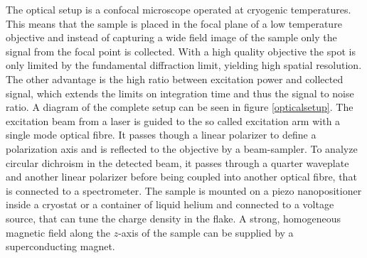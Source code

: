The optical setup is a confocal microscope operated at cryogenic temperatures. This means that the sample is placed in the focal plane of a low temperature objective and instead of capturing a wide field image of the sample only the signal from the focal point is collected. With a high quality objective the spot is only limited by the fundamental diffraction limit, yielding high spatial resolution. The other advantage is the high ratio between excitation power and collected signal, which extends the limits on integration time and thus the signal to noise ratio. A diagram of the complete setup can be seen in figure \ref{opticalsetup}. The excitation beam from a laser is guided to the so called excitation arm with a single mode optical fibre. It passes though a linear polarizer to define a polarization axis and is reflected to the objective by a beam-sampler. To analyze circular dichroism in the detected beam, it passes through a quarter waveplate and another linear polarizer before being coupled into another optical fibre, that is connected to a spectrometer. The sample is mounted on a piezo nanopositioner inside a cryostat or a container of liquid helium and connected to a voltage source, that can tune the charge density in the \tmdg flake. A strong, homogeneous magnetic field along the $z$-axis of the sample can be supplied by a superconducting magnet.

